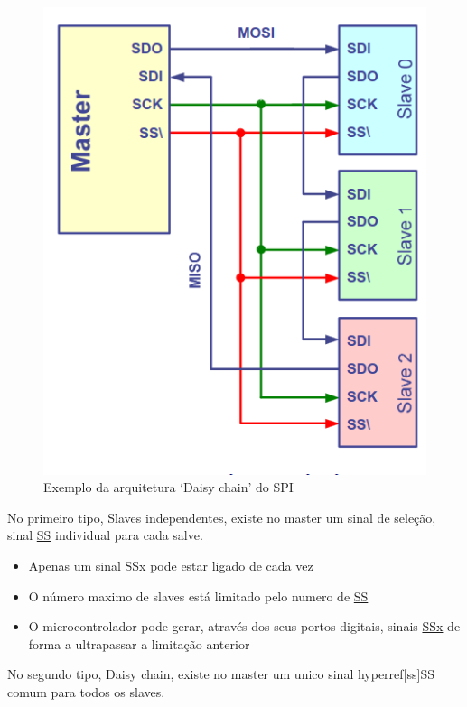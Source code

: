 \documentclass[a4paper, 12pt, onecolumn, oneside]{scrartcl}
\begin{document}
\begin{figure}[H]
\begin{minipage}{0.48\textwidth}
        \includegraphics[width=\textwidth]{Arquitetura-de-ligação-2_SPI.png}
        \caption{Exemplo da arquitetura `Daisy chain' do SPI}
    \end{minipage}
\end{figure}

No primeiro tipo, Slaves independentes, existe no master um sinal de seleção, 
sinal \hyperref[ss]{SS} individual para cada salve.
\begin{itemize}
    \item Apenas um sinal \hyperref[ss]{SSx} pode estar ligado de cada vez
    \item O número maximo de slaves está limitado pelo numero de \hyperref[ss]{SS}
    \item O microcontrolador pode gerar, através dos seus portos digitais, sinais \hyperref[ss]{SSx} de forma a ultrapassar a limitação anterior  
\end{itemize}

\clearpage
No segundo tipo, Daisy chain, existe no master um unico sinal hyperref[ss]{SS} comum para todos os slaves.
\end{document}
